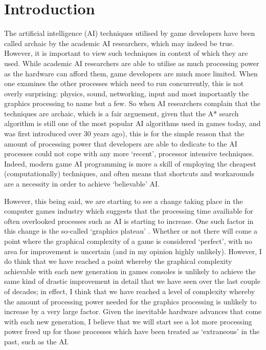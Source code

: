 \documentclass[a4paper,oneside]{report}
\begin{document}
%
%

\chapter{Introduction}

The artificial intelligence (AI) techniques utilised by game developers have been called archaic by the academic AI researchers, which may indeed be true. However, it is important to view such techniques in context of which they are used. While academic AI researchers are able to utilise as much processing power as the hardware can afford them, game developers are much more limited. When one examines the other processes which need to run concurrently, this is not overly surprising: physics, sound, networking, input and most importantly the graphics processing to name but a few. So when AI researchers complain that the techniques are archaic, which is a fair arguement, given that the A* search algorithm is still one of the most popular AI algorithms used in games today, and was first introduced over 30 years ago), this is for the simple reason that the amount of processing power that developers are able to dedicate to the AI processes could not cope with any more `recent', processor intensive techniques. Indeed, modern game AI programming is more a skill of employing the cheapest (computationally) techniques, and often means that shortcuts and workarounds are a necessity in order to achieve `believable' AI. 

However, this being said, we are starting to see a change taking place in the computer games industry which suggests that the processing time availiable for often overlooked processes such as AI is starting to increase. One such factor in this change is the so-called `graphics plateau' \cite{Sheffield:2008fk}. Whether or not there will come a point where the graphical complexity of a game is considered `perfect', with no area for improvement is uncertain (and in my opinion highly unlikely). However, I do think that we have reached a point whereby the graphical complexity achievable with each new generation in games consoles is unlikely to achieve the same kind of drastic improvement in detail that we have seen over the last couple of decades; in effect, I think that we have reached a level of complexity whereby the amount of processing power needed for the graphics processing is unlikely to increase by a very large factor. Given the inevitable hardware advances that come with each new generation, I believe that we will start see a lot more processing power freed up for those processes which have been treated as `extraneous' in the past, such as the AI. 
\end{document}
